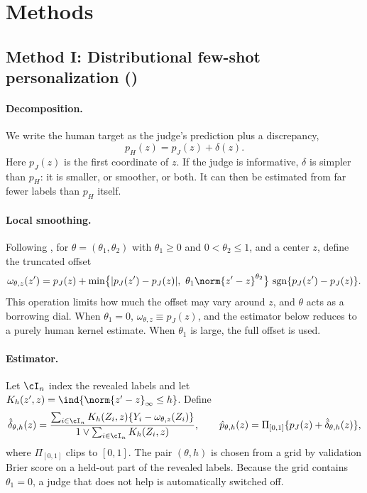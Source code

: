 \section{Methods}
\label{sec:methods}

\subsection{Method I: Distributional few-shot personalization (\dfsp)}
\label{sec:dfsp}

\paragraph{Decomposition.}
We write the human target as the judge's prediction plus a discrepancy,
\[
  p_H(z)=p_J(z)+\delta(z).
\]
Here $p_J(z)$ is the first coordinate of $z$. If the judge is informative, $\delta$ is simpler than
$p_H$: it is smaller, or smoother, or both. It can then be estimated from far fewer labels than
$p_H$ itself.

\paragraph{Local smoothing.}
Following \citet{li2026personalizing}, for $\theta=(\theta_1,\theta_2)$ with $\theta_1\ge0$ and
$0<\theta_2\le1$, and a center $z$, define the truncated offset
\[
  \omega_{\theta,z}(z')=p_J(z)+\min\bigl\{|p_J(z')-p_J(z)|,\ \theta_1\norm{z'-z}^{\theta_2}\bigr\}\,
  \operatorname{sgn}\{p_J(z')-p_J(z)\}.
\]
This operation limits how much the offset may vary around $z$, and $\theta$ acts as a borrowing
dial. When $\theta_1=0$, $\omega_{\theta,z}\equiv p_J(z)$, and the estimator below reduces to a purely
human kernel estimate. When $\theta_1$ is large, the full offset is used.

\paragraph{Estimator.}
Let $\cI_n$ index the revealed labels and let $K_h(z',z)=\ind\{\norm{z'-z}_\infty\le h\}$. Define
\[
  \hat\delta_{\theta,h}(z)=\frac{\sum_{i\in\cI_n}K_h(Z_i,z)\{Y_i-\omega_{\theta,z}(Z_i)\}}
                                 {1\vee\sum_{i\in\cI_n}K_h(Z_i,z)},
  \qquad
  \hat p_{\theta,h}(z)=\Pi_{[0,1]}\{p_J(z)+\hat\delta_{\theta,h}(z)\},
\]
where $\Pi_{[0,1]}$ clips to $[0,1]$. The pair $(\theta,h)$ is chosen from a grid by validation
Brier score on a held-out part of the revealed labels. Because the grid contains $\theta_1=0$, a
judge that does not help is automatically switched off.

